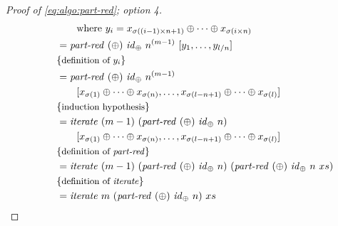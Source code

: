 \begin{proof}[Proof of \autoref{eq:algo:part-red}; option 4]
\begin{align*}
    &\qquad\qquad \text{where}\ y_i = x_{\sigma((i-1)\times n + 1)} \oplus \dots \oplus x_{\sigma(i\times n)}\\
    &\qquad = \partRed\ (\oplus)\ \id_\oplus\ n^{(m-1)}\ [y_1, \ldots, y_{l/n}]\\
    &\qquad \comment{definition of $y_i$}\\
    &\qquad = \partRed\ (\oplus)\ \id_\oplus\ n^{(m-1)}\\
    &\qquad\qquad [x_{\sigma(1)} \oplus \dots \oplus x_{\sigma(n)}, \ldots, x_{\sigma(l-n+1)} \oplus \dots \oplus x_{\sigma(l)}]\\
    &\qquad \comment{induction hypothesis}\\
    &\qquad = \iterateN\ (m-1)\ (\partRed\ (\oplus)\ \id_\oplus\ n)\\
    &\qquad\qquad [x_{\sigma(1)} \oplus \dots \oplus x_{\sigma(n)}, \ldots, x_{\sigma(l-n+1)} \oplus \dots \oplus x_{\sigma(l)}]\\
    &\qquad \comment{definition of \partRed}\\
    &\qquad = \iterateN\ (m-1)\ (\partRed\ (\oplus)\ \id_\oplus\ n)\ (\partRed\ (\oplus)\ \id_\oplus\ n\ xs)\\
    &\qquad \comment{definition of \iterateN}\\
    &\qquad = \iterateN\ m\ (\partRed\ (\oplus)\ \id_\oplus\ n)\ xs
  \end{align*}


\end{proof}
